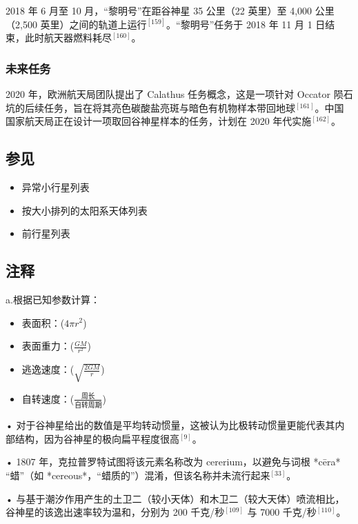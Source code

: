 2018 年 6 月至 10 月，“黎明号”在距谷神星 35 公里（22 英里）至 4,000 公里（2,500 英里）之间的轨道上运行$^{[159]}$。“黎明号”任务于 2018 年 11 月 1 日结束，此时航天器燃料耗尽$^{[160]}$。
\subsubsection{未来任务}
2020 年，欧洲航天局团队提出了 Calathus 任务概念，这是一项针对 Occator 陨石坑的后续任务，旨在将其亮色碳酸盐亮斑与暗色有机物样本带回地球$^{[161]}$。中国国家航天局正在设计一项取回谷神星样本的任务，计划在 2020 年代实施$^{[162]}$。
\subsection{参见}
\begin{itemize}
\item 异常小行星列表
\item 按大小排列的太阳系天体列表
\item 前行星列表
\end{itemize}
\subsection{注释}
a.根据已知参数计算：
\begin{itemize}
\item 表面积：($4\pi r^{2}$)
\item 表面重力：($\frac{GM}{r^{2}}$)
\item 逃逸速度：($\sqrt{\frac{2GM}{r}}$)
\item 自转速度：($\frac{\text{周长}}{\text{自转周期}}$)
\end{itemize}

• 对于谷神星给出的数值是平均转动惯量，这被认为比极转动惯量更能代表其内部结构，因为谷神星的极向扁平程度很高$^{[9]}$。

• 1807 年，克拉普罗特试图将该元素名称改为 cererium，以避免与词根 *cēra* “蜡”（如 *cereous*，“蜡质的”）混淆，但该名称并未流行起来$^{[33]}$。

• 与基于潮汐作用产生的土卫二（较小天体）和木卫二（较大天体）喷流相比，谷神星的该逸出速率较为温和，分别为 200 千克/秒$^{[109]}$ 与 7000 千克/秒$^{[110]}$。
